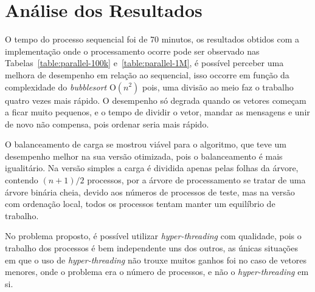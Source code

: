 \section{Análise dos Resultados}

O tempo do processo sequencial foi de 70 minutos, os resultados obtidos com a implementação onde o
processamento ocorre pode ser observado nas Tabelas~\ref{table:parallel-100k}
e~\ref{table:parallel-1M}, é possível perceber uma melhora de desempenho em relação ao sequencial, 
isso occorre em função da complexidade do \emph{bubblesort} O$(n^2)$ pois, uma divisão ao meio 
faz o trabalho quatro vezes mais rápido. O desempenho só degrada quando os vetores começam a ficar
muito pequenos, e o tempo de dividir o vetor, mandar as mensagens e unir de novo não compensa, pois
ordenar seria mais rápido.






O balanceamento de carga se mostrou viável para o algoritmo, que teve um desempenho melhor na sua
versão otimizada, pois o balanceamento é mais igualitário. Na versão simples a carga é dividida
apenas pelas folhas da árvore, contendo $(n + 1) / 2$ processos, por a árvore de processamento se
tratar de uma árvore binária cheia, devido aos números de processos de teste, mas na versão com
ordenação local, todos os processos tentam manter um equilíbrio de trabalho.






No problema proposto, é possível utilizar \emph{hyper-threading} com qualidade, pois o trabalho dos processos é bem independente uns dos outros, as únicas situações em que o uso de \emph{hyper-threading} não trouxe muitos ganhos foi no caso de vetores menores, onde o problema era o número de processos, e não o \emph{hyper-threading} em si.


